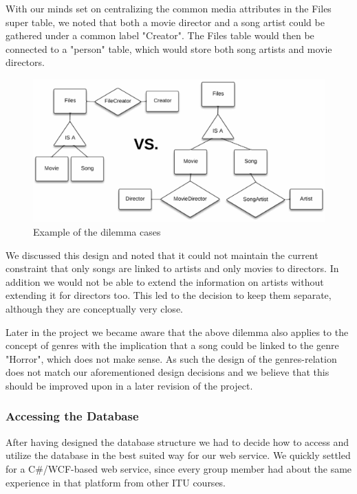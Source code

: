 With our minds set on centralizing the common media attributes in the Files
super table, we noted that both a movie director and a song artist could be
gathered under a common label "Creator". The Files table would then be
connected to a "person" table, which would store both song artists and movie
directors.


\begin{figure}[hbt]
	\centering
	\centerline{\includegraphics{./p1design/dilemma.png}}
	\caption{Example of the dilemma cases}
	\label{fig:erddilemma}
\end{figure}

We discussed this design and noted that it could not maintain the current
constraint that only songs are linked to artists and only movies to directors.
In addition we would not be able to extend the information on artists without
extending it for directors too. This led to the decision to keep them separate,
although they are conceptually very close.

Later in the project we became aware that the above dilemma also applies to the
concept of genres with the implication that a song could be linked to the genre
"Horror", which does not make sense. As such the design of the genres-relation
does not match our aforementioned design decisions and we believe that this
should be improved upon in a later revision of the project.

\subsubsection{Accessing the Database}
\label{sec:databaseaccess}
After having designed the database structure we had to decide how to access and
utilize the database in the best suited way for our web service. We quickly
settled for a C\#/WCF-based web service, since every group member had about the
same experience in that platform from other ITU courses.


